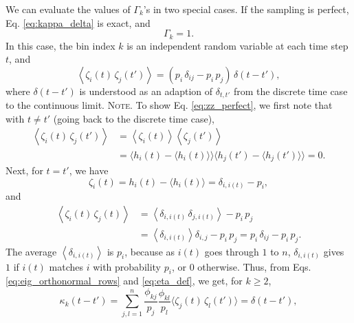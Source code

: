 \documentclass[reprint, floatfix]{revtex4-1}
\newcommand{\note}[1]{{\color{DarkGreen}\footnotesize \textsc{Note.} #1}}
\begin{document}
We can evaluate the values of $\Gamma_k$'s
in two special cases.
%
If the sampling is perfect,
Eq. \eqref{eq:kappa_delta} is exact, and
%
\begin{equation}
  \Gamma_k = 1.
  \label{eq:Gamma_perfect}
\end{equation}
%
In this case,
the bin index $k$ is an independent random variable
at each time step $t$, and
%
\begin{equation}
  \left\langle
    \zeta_i(t) \, \zeta_j(t')
  \right\rangle
  =
  \left( p_i \, \delta_{ij} - p_i \, p_j \right) \, \delta(t - t'),
  \label{eq:zz_perfect}
\end{equation}
%
where $\delta(t - t')$ is understood as an adaption of $\delta_{t, t'}$
from the discrete time case to the continuous limit. %
%
\note{To show Eq. \eqref{eq:zz_perfect}, we first note that
  with $t \ne t'$ (going back to the discrete time case),
  $$
  \begin{aligned}
  \left\langle
    \zeta_i(t) \, \zeta_j(t')
  \right\rangle
  &=
  \left\langle
    \zeta_i(t)
  \right\rangle
  \left\langle
    \zeta_j(t')
  \right\rangle
  \\
  &=
  \bigl\langle h_i(t)  - \langle h_i(t)  \rangle \bigr\rangle
  \bigl\langle h_j(t') - \langle h_j(t') \rangle \bigr\rangle
  =
  0.
  \end{aligned}
  $$
  Next, for $t = t'$, we have
  $$
  \zeta_i(t)
  = h_i(t) - \langle h_i(t) \rangle
  = \delta_{i, i(t)} - p_i,
  $$
  and
  $$
  \begin{aligned}
  \left\langle
    \zeta_i(t) \, \zeta_j(t)
  \right\rangle
  &=
  \left\langle
    \delta_{i, i(t)} \, \delta_{j, i(t)}
  \right\rangle
  -
  p_i \, p_j
  \\
  &=
  \left\langle
    \delta_{i, i(t)}
  \right\rangle
  \delta_{i, j}
  -
  p_i \, p_j
  =
  p_i \, \delta_{ij}
  - p_i \, p_j.
  \end{aligned}
  $$
  The average
  $\left\langle \delta_{i, i(t)} \right\rangle$ is $p_i$,
  because as $i(t)$ goes through $1$ to $n$,
  $\delta_{i, i(t)}$ gives $1$
  if $i(t)$ matches $i$ with probability $p_i$,
  or $0$ otherwise.
}
%
Thus, from Eqs. \eqref{eq:eig_orthonormal_rows} and \eqref{eq:eta_def},
we get, for $k \ge 2$,
%
\begin{equation}
  \kappa_k(t - t')
  =
  \sum_{j,l = 1}^n
  \frac{ \phi_{kj} } { p_j }
  \frac{ \phi_{kl} } { p_l }
  \langle \zeta_j(t) \, \zeta_l(t') \rangle
  = \delta(t - t'),
  \label{eq:kappa_perfect}
\end{equation}
%
\end{document}
